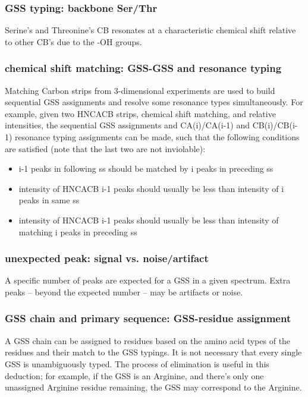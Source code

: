 \subsubsection{GSS typing: backbone Ser/Thr}
Serine's and Threonine's CB resonates at a characteristic chemical shift relative
to other CB's due to the -OH groups.

\subsubsection{chemical shift matching: GSS-GSS and resonance typing}
Matching Carbon strips from 3-dimensional experiments are used to build 
sequential GSS assignments and resolve some resonance types simultaneously. 
For example, given two HNCACB strips, chemical shift matching, and relative 
intensities, the sequential GSS assignments and CA(i)/CA(i-1) and CB(i)/CB(i-1) 
resonance typing assignments can be made, such that the following conditions
are satisfied (note that the last two are not inviolable):
\begin{itemize}
  \item i-1 peaks in following ss should be matched by i peaks in preceding ss
  \item intensity of HNCACB i-1 peaks should usually be less than intensity of i peaks in same ss
  \item intensity of HNCACB i-1 peaks should usually be less than intensity of matching i peaks in preceding ss
\end{itemize}

\subsubsection{unexpected peak: signal vs. noise/artifact}
A specific number of peaks are expected for a GSS in a given spectrum.
Extra peaks -- beyond the expected number -- may be artifacts or noise.

\subsubsection{GSS chain and primary sequence: GSS-residue assignment}
A GSS chain can be assigned to residues based on the amino acid types of the 
residues and their match to the GSS typings.  It is not necessary that every
single GSS is unambiguously typed.
The process of elimination is useful in this deduction; for example, if the
GSS is an Arginine, and there's only one unassigned Arginine residue remaining,
the GSS may correspond to the Arginine.

